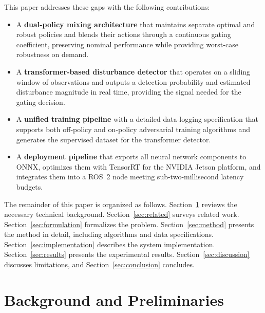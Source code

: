 \documentclass[conference]{IEEEtran}
\begin{document}
This paper addresses these gaps with the following contributions:
\begin{itemize}
\item A \textbf{dual-policy mixing architecture} that maintains separate
      optimal and robust policies and blends their actions through a
      continuous gating coefficient, preserving nominal performance while
      providing worst-case robustness on demand.
\item A \textbf{transformer-based disturbance detector} that operates on a
      sliding window of observations and outputs a detection probability
      and estimated disturbance magnitude in real time, providing the signal
      needed for the gating decision.
\item A \textbf{unified training pipeline} with a detailed data-logging
      specification that supports both off-policy and on-policy adversarial
      training algorithms and generates the supervised dataset for the
      transformer detector.
\item A \textbf{deployment pipeline} that exports all neural network
      components to ONNX, optimizes them with TensorRT for the NVIDIA
      Jetson platform, and integrates them into a ROS~2 node meeting
      sub-two-millisecond latency budgets.
\end{itemize}

The remainder of this paper is organized as follows.
Section~\ref{sec:background} reviews the necessary technical background.
Section~\ref{sec:related} surveys related work.
Section~\ref{sec:formulation} formalizes the problem.
Section~\ref{sec:method} presents the method in detail, including
algorithms and data specifications.
Section~\ref{sec:implementation} describes the system implementation.
Section~\ref{sec:results} presents the experimental results.
Section~\ref{sec:discussion} discusses limitations, and
Section~\ref{sec:conclusion} concludes.

\section{Background and Preliminaries}\label{sec:background}
\end{document}
